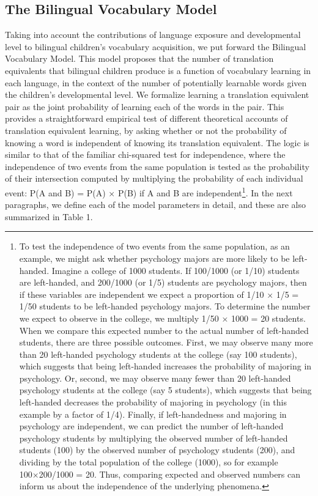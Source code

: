 \documentclass[
  english,
  ,man,floatsintext]{apa6}
\begin{document}
\hypertarget{the-bilingual-vocabulary-model}{%
\subsection{The Bilingual Vocabulary Model}\label{the-bilingual-vocabulary-model}}

Taking into account the contributions of language exposure and developmental level to bilingual children's vocabulary acquisition, we put forward the Bilingual Vocabulary Model. This model proposes that the number of translation equivalents that bilingual children produce is a function of vocabulary learning in each language, in the context of the number of potentially learnable words given the children's developmental level. We formalize learning a translation equivalent pair as the joint probability of learning each of the words in the pair. This provides a straightforward empirical test of different theoretical accounts of translation equivalent learning, by asking whether or not the probability of knowing a word is independent of knowing its translation equivalent. The logic is similar to that of the familiar chi-squared test for independence, where the independence of two events from the same population is tested as the probability of their intersection computed by multiplying the probability of each individual event: P(A and B) = P(A) × P(B) if A and B are independent\footnote{To test the independence of two events from the same population, as an example, we might ask whether psychology majors are more likely to be left-handed. Imagine a college of 1000 students. If 100/1000 (or 1/10) students are left-handed, and 200/1000 (or 1/5) students are psychology majors, then if these variables are independent we expect a proportion of 1/10 × 1/5 = 1/50 students to be left-handed psychology majors. To determine the number we expect to observe in the college, we multiply 1/50 × 1000 = 20 students. When we compare this expected number to the actual number of left-handed students, there are three possible outcomes. First, we may observe many more than 20 left-handed psychology students at the college (say 100 students), which suggests that being left-handed increases the probability of majoring in psychology. Or, second, we may observe many fewer than 20 left-handed psychology students at the college (say 5 students), which suggests that being left-handed decreases the probability of majoring in psychology (in this example by a factor of 1/4). Finally, if left-handedness and majoring in psychology are independent, we can predict the number of left-handed psychology students by multiplying the observed number of left-handed students (100) by the observed number of psychology students (200), and dividing by the total population of the college (1000), so for example 100×200/1000 = 20. Thus, comparing expected and observed numbers can inform us about the independence of the underlying phenomena.}. In the next paragraphs, we define each of the model parameters in detail, and these are also summarized in Table 1.
\end{document}
